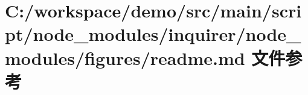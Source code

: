 \hypertarget{node__modules_2inquirer_2node__modules_2figures_2_r_e_a_d_m_e_8md}{}\section{C\+:/workspace/demo/src/main/script/node\+\_\+modules/inquirer/node\+\_\+modules/figures/readme.md 文件参考}
\label{node__modules_2inquirer_2node__modules_2figures_2_r_e_a_d_m_e_8md}
